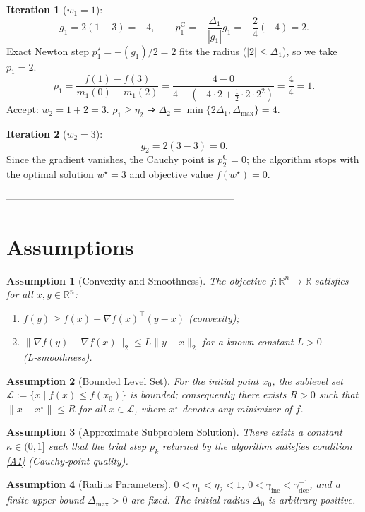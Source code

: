 \documentclass{article}
\newtheorem{assumption}{Assumption}
\begin{document}
\medskip
\noindent\textbf{Iteration 1} (\(w_1=1\)):
\[
g_1=2(1-3)=-4,\qquad p_1^{\text{C}}=-\frac{\Delta_1}{|g_1|}g_1
 =-\frac{2}{4}(-4)=2 .
\]
Exact Newton step \(p^{\star}_1=-(g_1)/2=2\) fits the radius (\(|2|\le\Delta_1\)),
so we take \(p_1=2\).
\[
\rho_1=\frac{f(1)-f(3)}{m_1(0)-m_1(2)}
 =\frac{4-0}{4-( -4\cdot2+\tfrac12\cdot2\cdot2^2)}=\frac{4}{4}=1 .
\]
Accept: \(w_2=1+2=3\).  
\(\rho_1\ge\eta_2\) ⇒ \(\Delta_2= \min\{2\Delta_1,\Delta_{\max}\}=4\).

\medskip
\noindent\textbf{Iteration 2} (\(w_2=3\)):
\[
g_2=2(3-3)=0 .
\]
Since the gradient vanishes, the Cauchy point is \(p_2^{\text{C}}=0\); the algorithm stops
with the optimal solution \(w^{\star}=3\) and objective value \(f(w^{\star})=0\).

---------------------------------------------------------------------

\section*{Assumptions}
\begin{assumption}[Convexity and Smoothness]\label{as:convex}
The objective \(f:\mathbb{R}^n\to\mathbb{R}\) satisfies for all \(x,y\in\mathbb{R}^n\):
\begin{enumerate}
  \item \(\displaystyle f(y)\ge f(x)+\nabla f(x)^{\top}(y-x)\)  \;(convexity);
  \item \(\displaystyle \|\nabla f(y)-\nabla f(x)\|_2\le L\|y-x\|_2\) for a known constant \(L>0\) 
        \;(L‑smoothness).
\end{enumerate}
\end{assumption}

\begin{assumption}[Bounded Level Set]\label{as:bounded}
For the initial point \(x_0\), the sublevel set
\(\mathcal{L}:=\{x\mid f(x)\le f(x_0)\}\) is bounded; consequently there exists
\(R>0\) such that \(\|x-x^{\star}\|\le R\) for all \(x\in\mathcal{L}\), where
\(x^{\star}\) denotes any minimizer of \(f\).
\end{assumption}

\begin{assumption}[Approximate Subproblem Solution]\label{as:approx}
There exists a constant \(\kappa\in(0,1]\) such that the trial step \(p_k\) returned by the
algorithm satisfies condition \eqref{A1} (Cauchy‑point quality).
\end{assumption}

\begin{assumption}[Radius Parameters]\label{as:radius}
\(0<\eta_1<\eta_2<1\), \(0<\gamma_{\text{inc}}<\gamma_{\text{dec}}^{-1}\), and a finite upper bound
\(\Delta_{\max}>0\) are fixed.  The initial radius \(\Delta_0\) is arbitrary positive.
\end{assumption}
\end{document}

